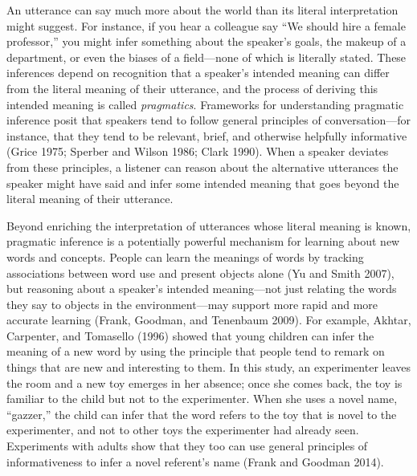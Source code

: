 \documentclass{ucetd}
\begin{document}
An utterance can say much more about the world than its literal
interpretation might suggest. For instance, if you hear a colleague say
``We should hire a female professor,'' you might infer something about
the speaker's goals, the makeup of a department, or even the biases of a
field---none of which is literally stated. These inferences depend on
recognition that a speaker's intended meaning can differ from the
literal meaning of their utterance, and the process of deriving this
intended meaning is called \emph{pragmatics}. Frameworks for
understanding pragmatic inference posit that speakers tend to follow
general principles of conversation---for instance, that they tend to be
relevant, brief, and otherwise helpfully informative (Grice 1975;
Sperber and Wilson 1986; Clark 1990). When a speaker deviates from these
principles, a listener can reason about the alternative utterances the
speaker might have said and infer some intended meaning that goes beyond
the literal meaning of their utterance.

Beyond enriching the interpretation of utterances whose literal meaning
is known, pragmatic inference is a potentially powerful mechanism for
learning about new words and concepts. People can learn the meanings of
words by tracking associations between word use and present objects
alone (Yu and Smith 2007), but reasoning about a speaker's intended
meaning---not just relating the words they say to objects in the
environment---may support more rapid and more accurate learning (Frank,
Goodman, and Tenenbaum 2009). For example, Akhtar, Carpenter, and
Tomasello (1996) showed that young children can infer the meaning of a
new word by using the principle that people tend to remark on things
that are new and interesting to them. In this study, an experimenter
leaves the room and a new toy emerges in her absence; once she comes
back, the toy is familiar to the child but not to the experimenter. When
she uses a novel name, ``gazzer,'' the child can infer that the word
refers to the toy that is novel to the experimenter, and not to other
toys the experimenter had already seen. Experiments with adults show
that they too can use general principles of informativeness to infer a
novel referent's name (Frank and Goodman 2014).
\end{document}
